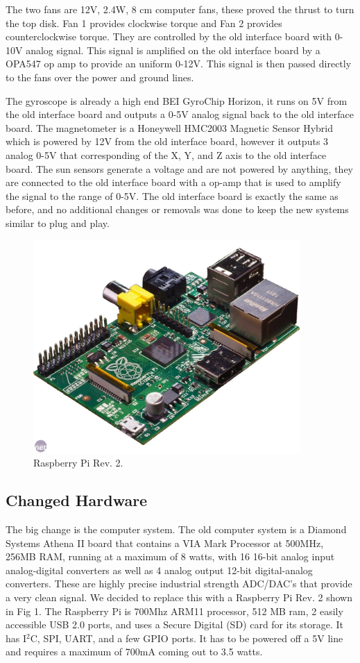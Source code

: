 \documentclass[conference, onecolumn, 12pt]{IEEEtran}
\begin{document}
The two fans are 12V, 2.4W, 8 cm computer fans, these proved the thrust to turn the top disk. Fan 1 provides clockwise torque and Fan 2 provides counterclockwise torque. They are controlled by the old interface board with 0-10V analog signal. This signal is amplified on the old interface board by a OPA547 op amp to provide an uniform 0-12V. This signal is then passed directly to the fans over the power and ground lines.

The gyroscope is already a high end BEI GyroChip Horizon, it runs on 5V from the old interface board and outputs a 0-5V analog signal back to the old interface board. The magnetometer is a Honeywell HMC2003 Magnetic Sensor Hybrid which is powered by 12V from the old interface board, however it outputs 3 analog 0-5V that corresponding of the X, Y, and Z axis to the old interface board. The sun sensors generate a voltage and are not powered by anything, they are connected to the old interface board with a op-amp that is used to amplify the signal to the range of 0-5V. The old interface board is exactly the same as before, and no additional changes or removals was done to keep the new systems similar to plug and play.

\begin{figure}
\centering
\includegraphics[width=4in]{rpi.jpg}
\caption{Raspberry Pi Rev. 2.}    
\end{figure}

\subsection{Changed Hardware}
The big change is the computer system. The old computer system is a Diamond Systems Athena II board that contains a VIA Mark Processor at 500MHz, 256MB RAM, running at a maximum of 8 watts, with 16 16-bit analog input analog-digital converters as well as 4 analog output 12-bit digital-analog converters. These are highly precise industrial strength ADC/DAC's that provide a very clean signal. We decided to replace this with a Raspberry Pi Rev. 2 shown in Fig 1. The Raspberry Pi is 700Mhz ARM11 processor, 512 MB ram, 2 easily accessible USB 2.0 ports, and uses a Secure Digital (SD) card for its storage. It has I$^2$C, SPI, UART, and a few GPIO ports. It has to be powered off a 5V line and requires a maximum of 700mA coming out to 3.5 watts. 
\end{document}
